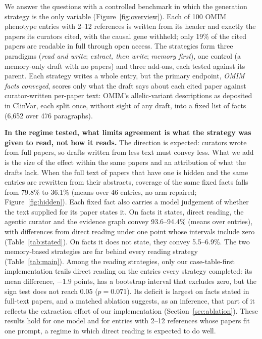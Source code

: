 \documentclass{article} %
\begin{document}
We answer the questions with a controlled benchmark in which the generation strategy is the only variable (Figure~\ref{fig:overview}). Each of 100 OMIM phenotype entries with 2--12 references is written from its header and exactly the papers its curators cited, with the causal gene withheld; only 19\% of the cited papers are readable in full through open access. The strategies form three paradigms (\emph{read and write}; \emph{extract, then write}; \emph{memory first}), one control (a memory-only draft with no papers) and three add-ons, each tested against its parent. Each strategy writes a whole entry, but the primary endpoint, \emph{OMIM facts conveyed}, scores only what the draft says about each cited paper against curator-written per-paper text: OMIM's allelic-variant descriptions as deposited in ClinVar, each split once, without sight of any draft, into a fixed list of facts (6,652 over 476 paragraphs).

\textbf{In the regime tested, what limits agreement is what the strategy was given to read, not how it reads.} The direction is expected: curators wrote from full papers, so drafts written from less text must convey less. What we add is the size of the effect within the same papers and an attribution of what the drafts lack. When the full text of papers that have one is hidden and the same entries are rewritten from their abstracts, coverage of the same fixed facts falls from 79.8\% to 36.1\% (means over 46 entries, no arm repaired; Figure~\ref{fig:hidden}). Each fixed fact also carries a model judgement of whether the text supplied for its paper states it. On facts it states, direct reading, the agentic curator and the evidence graph convey 93.6--94.4\% (means over entries), with differences from direct reading under one point whose intervals include zero (Table~\ref{tab:stated}). On facts it does not state, they convey 5.5--6.9\%. The two memory-based strategies are far behind every reading strategy (Table~\ref{tab:main}). Among the reading strategies, only our case-table-first implementation trails direct reading on the entries every strategy completed: its mean difference, $-1.9$ points, has a bootstrap interval that excludes zero, but the sign test does not reach 0.05 ($p=0.071$). Its deficit is largest on facts stated in full-text papers, and a matched ablation suggests, as an inference, that part of it reflects the extraction effort of our implementation (Section~\ref{sec:ablation}). These results hold for one model and for entries with 2--12 references whose papers fit one prompt, a regime in which direct reading is expected to do well.
\end{document}

